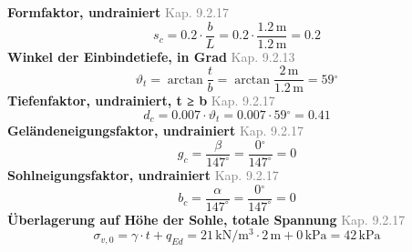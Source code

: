 \documentclass[11pt,a4paper]{article}
\newcommand{\normref}[1]{{\small\textcolor{gray}{#1}}}
\begin{document}
\noindent\textbf{Formfaktor, undrainiert} \hfill \normref{Kap. 9.2.17}
\begin{equation*}
s_c = 0.2 \cdot \frac{b}{L} = 0.2 \cdot \frac{1.2\,\mathrm{m}}{1.2\,\mathrm{m}} = 0.2
\end{equation*}
\noindent\textbf{Winkel der Einbindetiefe, in Grad} \hfill \normref{Kap. 9.2.13}
\begin{equation*}
\vartheta_t = \arctan\frac{t}{b} = \arctan\frac{2\,\mathrm{m}}{1.2\,\mathrm{m}} = 59{}^{\circ}
\end{equation*}
\noindent\textbf{Tiefenfaktor, undrainiert, t ≥ b} \hfill \normref{Kap. 9.2.17}
\begin{equation*}
d_c = 0.007 \cdot \vartheta_t = 0.007 \cdot 59{}^{\circ} = 0.41
\end{equation*}
\noindent\textbf{Geländeneigungsfaktor, undrainiert} \hfill \normref{Kap. 9.2.17}
\begin{equation*}
g_c = \frac{\beta}{147^\circ} = \frac{0{}^{\circ}}{147^\circ} = 0
\end{equation*}
\noindent\textbf{Sohlneigungsfaktor, undrainiert} \hfill \normref{Kap. 9.2.17}
\begin{equation*}
b_c = \frac{\alpha}{147^\circ} = \frac{0{}^{\circ}}{147^\circ} = 0
\end{equation*}
\noindent\textbf{Überlagerung auf Höhe der Sohle, totale Spannung} \hfill \normref{Kap. 9.2.17}
\begin{equation*}
\sigma_{v,0} = \gamma \cdot t + q_{Ed} = 21\,\mathrm{kN}/\mathrm{m}^{3} \cdot 2\,\mathrm{m} + 0\,\mathrm{kPa} = 42\,\mathrm{kPa}
\end{equation*}
\end{document}
